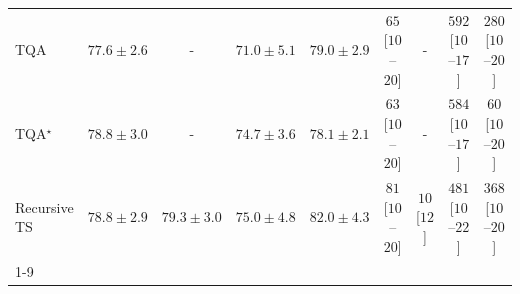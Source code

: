 \begin{tabular}{l|cccc|cccc|}
TQA & {\cellcolor[HTML]{4295C3}} \color[HTML]{F1F1F1} $77.6\pm 2.6$ & {\cellcolor[HTML]{000000}} \color[HTML]{F1F1F1} {\cellcolor{white}} \color{black} - & {\cellcolor[HTML]{FFF7FB}} \color[HTML]{000000} $71.0\pm 5.1$ & {\cellcolor[HTML]{0D75B3}} \color[HTML]{F1F1F1} $79.0\pm 2.9$ & {\cellcolor[HTML]{FEE9E5}} \color[HTML]{000000} $65$ [$10$--$20$] & {\cellcolor[HTML]{000000}} \color[HTML]{F1F1F1} {\cellcolor{white}} \color{black} - & {\cellcolor[HTML]{B30681}} \color[HTML]{F1F1F1} $592$ [$10$--$17$] & {\cellcolor[HTML]{FAA8B8}} \color[HTML]{000000} $280$ [$10$--$20$] \\
TQA$^\star$ & {\cellcolor[HTML]{157AB5}} \color[HTML]{F1F1F1} $78.8\pm 3.0$ & {\cellcolor[HTML]{000000}} \color[HTML]{F1F1F1} {\cellcolor{white}} \color{black} - & {\cellcolor[HTML]{B3C3DE}} \color[HTML]{000000} $74.7\pm 3.6$ & {\cellcolor[HTML]{2D8ABD}} \color[HTML]{F1F1F1} $78.1\pm 2.1$ & {\cellcolor[HTML]{FEE9E6}} \color[HTML]{000000} $63$ [$10$--$20$] & {\cellcolor[HTML]{000000}} \color[HTML]{F1F1F1} {\cellcolor{white}} \color{black} - & {\cellcolor[HTML]{B70B83}} \color[HTML]{F1F1F1} $584$ [$10$--$17$] & {\cellcolor[HTML]{FEEAE7}} \color[HTML]{000000} $60$ [$10$--$20$] \\
Recursive TS & {\cellcolor[HTML]{157AB5}} \color[HTML]{F1F1F1} $78.8\pm 2.9$ & {\cellcolor[HTML]{056FAE}} \color[HTML]{F1F1F1} $79.3\pm 3.0$ & {\cellcolor[HTML]{A9BFDC}} \color[HTML]{000000} $75.0\pm 4.8$ & {\cellcolor[HTML]{023858}} \color[HTML]{F1F1F1} $82.0\pm 4.3$ & {\cellcolor[HTML]{FDE5E2}} \color[HTML]{000000} $81$ [$10$--$20$] & {\cellcolor[HTML]{FFF6F2}} \color[HTML]{000000} $10$ [$12$] & {\cellcolor[HTML]{E34099}} \color[HTML]{F1F1F1} $481$ [$10$--$22$] & {\cellcolor[HTML]{F87CA8}} \color[HTML]{F1F1F1} $368$ [$10$--$20$] \\
\cline{1-9}
\bottomrule
\end{tabular}
